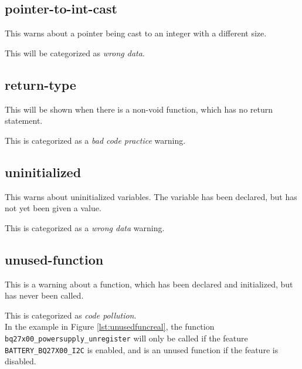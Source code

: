 \documentclass[a4paper,11pt]{report}
\begin{document}
            \subsection*{pointer-to-int-cast}
This warns about a pointer being cast to an integer with a different size.

This will be categorized as \emph{wrong data}.


            \subsection*{return-type}
This will be shown when there is a non-void function, which has no return 
statement.

This is categorized as a \emph{bad code practice} warning.


            %

            \subsection*{uninitialized}
This warns about uninitialized variables. The variable has been declared, but 
has not yet been given a value.

This is categorized as a \emph{wrong data} warning.


            \subsection*{unused-function}
This is a warning about a function, which has been declared and initialized, 
but has never been called. 

This is categorized as \emph{code pollution}.
\\

In the example in Figure \ref{lst:unusedfuncreal}, the function 
\texttt{bq27x00\_powersupply\_unregister} will only be called if the feature 
\texttt{BATTERY\_BQ27X00\_I2C} is enabled, and is  an 
unused function if the feature is disabled.
\end{document}
